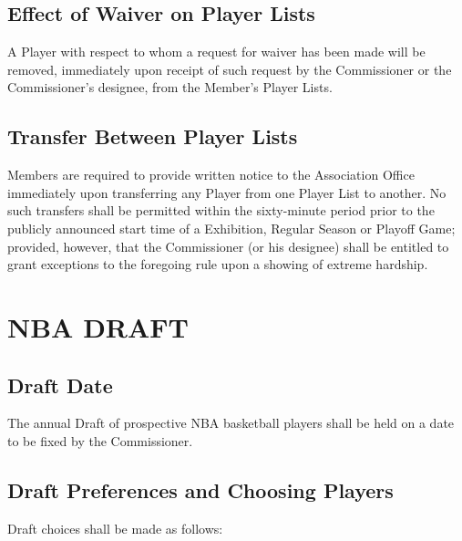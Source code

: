 \documentclass[]{book}
\begin{document}
\hypertarget{effect-of-waiver-on-player-lists}{%
\subsection{Effect of Waiver on Player Lists}\label{effect-of-waiver-on-player-lists}}

A Player with respect to whom a request for waiver has been made will be removed, immediately upon receipt of such request by the Commissioner or the Commissioner's designee, from the Member's Player Lists.

\hypertarget{transfer-between-player-lists}{%
\subsection{Transfer Between Player Lists}\label{transfer-between-player-lists}}

Members are required to provide written notice to the Association Office immediately upon transferring any Player from one Player List to another. No such transfers shall be permitted within the sixty-minute period prior to the publicly announced start time of a Exhibition, Regular Season or Playoff Game; provided, however, that the Commissioner (or his designee) shall be entitled to grant exceptions to the foregoing rule upon a showing of extreme hardship.

\hypertarget{nba-draft}{%
\section{NBA DRAFT}\label{nba-draft}}

\hypertarget{draft-date}{%
\subsection{Draft Date}\label{draft-date}}

The annual Draft of prospective NBA basketball players shall be held on a date to be fixed by the Commissioner.

\hypertarget{draft-preferences-and-choosing-players}{%
\subsection{Draft Preferences and Choosing Players}\label{draft-preferences-and-choosing-players}}

Draft choices shall be made as follows:
\end{document}
